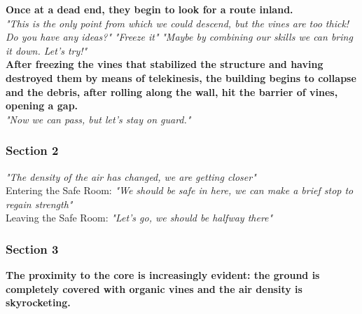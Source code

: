 \begin{dialogue}
	
	\textbf{Once at a dead end, they begin to look for a route inland.}\\
	
	
	 \textit{"This is the only point from which we could descend, but the vines are too thick! Do you have any ideas?"}
	 
	 
	 \textit{"Freeze it"}
	  \textit{"Maybe by combining our skills we can bring it down. Let's try!"}\\
	
	
	\textbf{After freezing the vines that stabilized the structure and having destroyed them by means of telekinesis, the building begins to collapse and the debris, after rolling along the wall, hit the barrier of vines, opening a gap.}\\
	
	
	 \textit{"Now we can pass, but let's stay on guard."}
	
\end{dialogue}


\subsubsection{Section 2}
\vspace*{0.3cm}

\begin{dialogue}
	 
	 \textit{"The density of the air has changed, we are getting closer"}\\
	
	Entering the Safe Room:
	 \textit{"We should be safe in here, we can make a brief stop to regain strength"}\\
	
	Leaving the Safe Room:
	 \textit{"Let's go, we should be halfway there"}
\end{dialogue}


\subsubsection{Section 3}
\vspace*{0.3cm}


	\textbf{The proximity to the core is increasingly evident: the ground is completely covered with organic vines and the air density is skyrocketing.}

